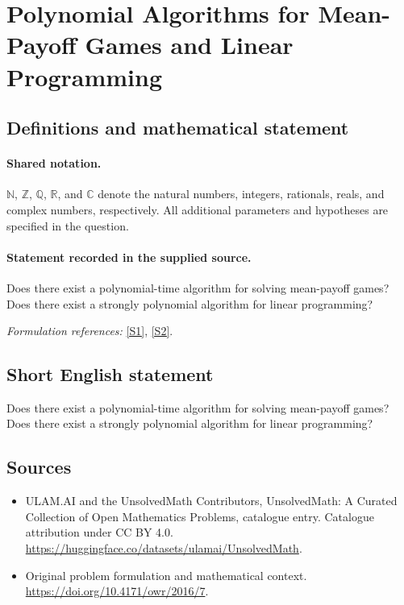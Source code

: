 \documentclass[11pt]{article}
\newcommand{\sref}[2]{\hyperlink{source:#1:#2}{[S#2]}}
\begin{document}
\section{Polynomial Algorithms for Mean-Payoff Games and Linear Programming}\label{statement}

\subsection{Definitions and mathematical statement}

\paragraph{Shared notation.}$\mathbb N$, $\mathbb Z$, $\mathbb Q$, $\mathbb R$, and $\mathbb C$ denote the natural numbers, integers, rationals, reals, and complex numbers, respectively. All additional parameters and hypotheses are specified in the question.


\paragraph{Statement recorded in the supplied source.}
Does there exist a polynomial-time algorithm for solving mean-payoff games? Does there exist a strongly polynomial algorithm for linear programming?
\par\smallskip\textit{Formulation references:} \sref{statement}{1}, \sref{statement}{2}.
\subsection{Short English statement}
Does there exist a polynomial-time algorithm for solving mean-payoff games? Does there exist a strongly polynomial algorithm for linear programming?
\subsection{Sources}
\begin{itemize}
\item[\hypertarget{source:statement:1}{S1}] ULAM.AI and the UnsolvedMath Contributors, UnsolvedMath: A Curated Collection of Open Mathematics Problems, catalogue entry. Catalogue attribution under CC BY 4.0.
\url{https://huggingface.co/datasets/ulamai/UnsolvedMath}.
\item[\hypertarget{source:statement:2}{S2}] Original problem formulation and mathematical context.
\url{https://doi.org/10.4171/owr/2016/7}.
\end{itemize}
\label{end:statement}
\end{document}
